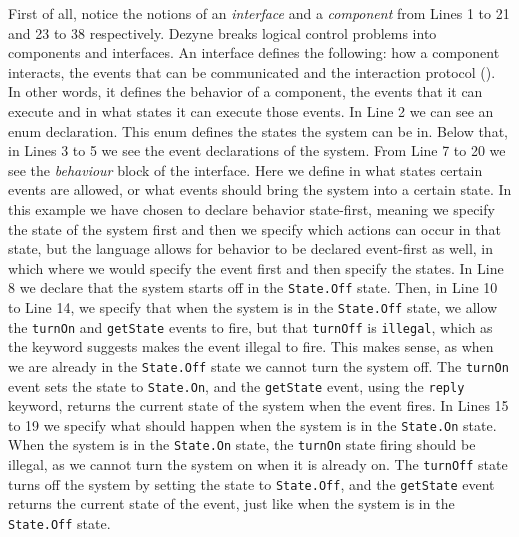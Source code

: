 \documentclass[12pt]{scrreprt}
\begin{document}
First of all, notice the notions of an \textit{interface} and a \textit{component} from Lines 1 to 21 and 23 to 38 respectively. Dezyne breaks logical control problems into components and interfaces. An interface defines the following: how a component interacts, the events that can be communicated and the interaction protocol (\cite{dzndoc}). In other words, it defines the behavior of a component, the events that it can execute and in what states it can execute those events. In Line 2 we can see an enum declaration. This enum defines the states the system can be in. Below that, in Lines 3 to 5 we see the event declarations of the system. %
From Line 7 to 20 we see the \textit{behaviour} block of the interface. Here we define in what states certain events are allowed, or what events should bring the system into a certain state. In this example we have chosen to declare behavior state-first, meaning we specify the state of the system first and then we specify which actions can occur in that state, but the language allows for behavior to be declared event-first as well, in which where we would specify the event first and then specify the states.
In Line 8 we declare that the system starts off in the \texttt{State.Off} state. Then, in Line 10 to Line 14, we specify that when the system is in the \texttt{State.Off} state, we allow the \texttt{turnOn} and \texttt{getState} events to fire, but that \texttt{turnOff} is \texttt{illegal}, which as the keyword suggests makes the event illegal to fire. This makes sense, as when we are already in the \texttt{State.Off} state we cannot turn the system off. The \texttt{turnOn} event sets the state to \texttt{State.On}, and the \texttt{getState} event, using the \texttt{reply} keyword, returns the current state of the system when the event fires. In Lines 15 to 19 we specify what should happen when the system is in the \texttt{State.On} state. When the system is in the \texttt{State.On} state, the \texttt{turnOn} state firing should be illegal, as we cannot turn the system on when it is already on. The \texttt{turnOff} state turns off the system by setting the state to \texttt{State.Off}, and the \texttt{getState} event returns the current state of the event, just like when the system is in the \texttt{State.Off} state.
\\\\
\end{document}
